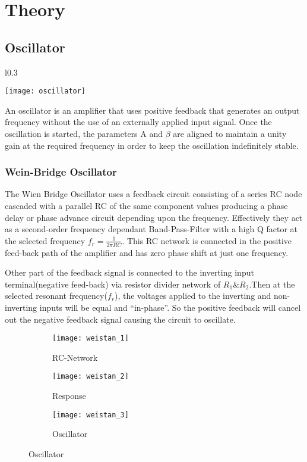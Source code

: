 \documentclass[class=article,crop=false]{standalone}
\begin{document}
\twocolumn

\section{Theory}
\subsection{Oscillator}
\begin{wrapfigure}{l}{0.3\columnwidth}
  \vspace*{-.5cm}
  \begin{center}
    \texttt{[image: oscillator]}
  \end{center}
  \vspace*{-.5cm}
\end{wrapfigure}

An oscillator is an amplifier that uses positive feedback that generates an output frequency without the use of an externally applied input signal. Once the oscillation is started, the parameters A and $\beta$ are aligned to maintain a unity gain at the required frequency in order to keep the oscillation indefinitely stable.

\subsubsection*{Wein-Bridge Oscillator}
The Wien Bridge Oscillator uses a feedback circuit consisting of a series RC node cascaded with a parallel RC of the same component values producing a phase delay or phase advance circuit depending upon the frequency. Effectively they act as a second-order frequency dependant Band-Pass-Filter with a high Q factor at the selected frequency $f_r=\frac{1}{2\pi RC}$. This RC network is connected in the positive feed-back path of the amplifier and has zero phase shift at just one frequency.
\par
Other part of the feedback signal is connected to the inverting input terminal(negative feed-back) via resistor divider network of $R_1\&R_2$.Then at the selected resonant frequency($f_r$), the voltages applied to the inverting and non-inverting inputs will be equal and “in-phase”. So the positive feedback will cancel out the negative feedback signal causing the circuit to oscillate.

\begin{figure} 
  \begin{subfigure}{.33\columnwidth}
    \centering
    \texttt{[image: weistan\_1]}
    \caption*{RC-Network}  
  \end{subfigure}
  \begin{subfigure}{.33\columnwidth}
    \centering
    \texttt{[image: weistan\_2]}  
    \caption*{Response}
  \end{subfigure}
  \begin{subfigure}{.3\columnwidth}
    \centering
    \texttt{[image: weistan\_3]}
    \caption*{Oscillator}  
  \end{subfigure}
\end{figure}
\end{document}
